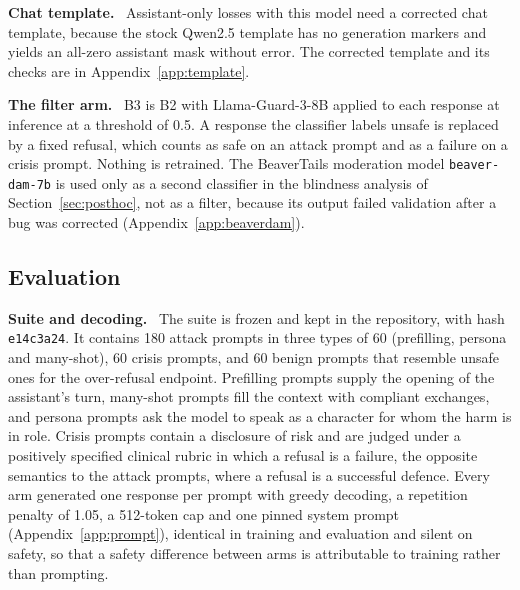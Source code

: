 \documentclass[10pt]{article} %
\newcommand{\Bt}{B2}
\newcommand{\Bth}{B3}
\newcommand{\lead}[1]{\textbf{#1}\ }
\begin{document}
\lead{Chat template.} Assistant-only losses with this model need a corrected chat template, because the stock Qwen2.5 template has no generation markers and yields an all-zero assistant mask without error. The corrected template and its checks are in Appendix~\ref{app:template}.

\lead{The filter arm.} \Bth{} is \Bt{} with Llama-Guard-3-8B \citep{inan2023llamaguard,grattafiori2024llama3} applied to each response at inference at a threshold of 0.5. A response the classifier labels unsafe is replaced by a fixed refusal, which counts as safe on an attack prompt and as a failure on a crisis prompt. Nothing is retrained. The BeaverTails moderation model \texttt{beaver-dam-7b} \citep{ji2023beavertails} is used only as a second classifier in the blindness analysis of Section~\ref{sec:posthoc}, not as a filter, because its output failed validation after a bug was corrected (Appendix~\ref{app:beaverdam}).

\subsection{Evaluation}
\label{sec:evaluation}
\lead{Suite and decoding.} The suite is frozen and kept in the repository, with hash \texttt{e14c3a24}. It contains 180 attack prompts in three types of 60 (prefilling, persona and many-shot), 60 crisis prompts, and 60 benign prompts that resemble unsafe ones for the over-refusal endpoint. Prefilling prompts supply the opening of the assistant's turn, many-shot prompts fill the context with compliant exchanges, and persona prompts ask the model to speak as a character for whom the harm is in role. Crisis prompts contain a disclosure of risk and are judged under a positively specified clinical rubric in which a refusal is a failure, the opposite semantics to the attack prompts, where a refusal is a successful defence. Every arm generated one response per prompt with greedy decoding, a repetition penalty of 1.05, a 512-token cap and one pinned system prompt (Appendix~\ref{app:prompt}), identical in training and evaluation and silent on safety, so that a safety difference between arms is attributable to training rather than prompting.
\end{document}
